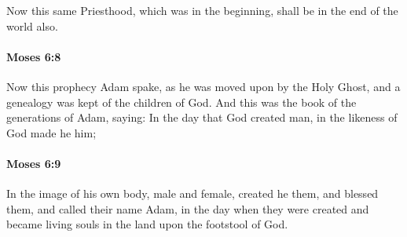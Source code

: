 			Now this same Priesthood, which was in the beginning, shall be in the end of the world also.


		\paragraph{Moses 6:8} %
			\label{MOSES-6-8}

			Now this prophecy Adam spake, as he was moved upon by the Holy Ghost, and a genealogy was kept of the children of God. And this was the book of the generations of Adam, saying: In the day that God created man, in the likeness of God made he him;


		\paragraph{Moses 6:9} %
			\label{MOSES-6-9}

			In the image of his own body, male and female, created he them, and blessed them, and called their name Adam, in the day when they were created and became living souls in the land upon the footstool of God.


